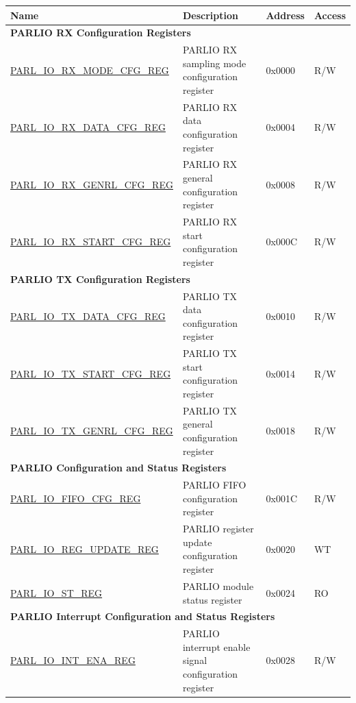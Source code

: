 \begin{longtable}{ | p{5cm} | p{7.8cm} | p{1.3cm} | p{1.6cm} | }
\hline\rowcolor{lightgray}
\textbf{Name} & \textbf{Description} &  \textbf{Address} & \textbf{Access} \\ \hline
\endhead
\multicolumn{4}{|l|}{\textbf{PARLIO RX Configuration Registers}} \\ \hline
\hyperref[regdesc:PARLIORXMODECFGREG]{PARL\_IO\_RX\_MODE\_CFG\_REG} & PARLIO RX sampling mode configuration register & 0x0000 & R/W \\ \hline
\hyperref[regdesc:PARLIORXDATACFGREG]{PARL\_IO\_RX\_DATA\_CFG\_REG} & PARLIO RX data configuration register & 0x0004 & R/W \\ \hline
\hyperref[regdesc:PARLIORXGENRLCFGREG]{PARL\_IO\_RX\_GENRL\_CFG\_REG} & PARLIO RX general configuration register & 0x0008 & R/W \\ \hline
\hyperref[regdesc:PARLIORXSTARTCFGREG]{PARL\_IO\_RX\_START\_CFG\_REG} & PARLIO RX start configuration register & 0x000C & R/W \\ \hline
\multicolumn{4}{|l|}{\textbf{PARLIO TX Configuration Registers}} \\ \hline
\hyperref[regdesc:PARLIOTXDATACFGREG]{PARL\_IO\_TX\_DATA\_CFG\_REG} & PARLIO TX data configuration register & 0x0010 & R/W \\ \hline
\hyperref[regdesc:PARLIOTXSTARTCFGREG]{PARL\_IO\_TX\_START\_CFG\_REG} & PARLIO TX start configuration register & 0x0014 & R/W \\ \hline
\hyperref[regdesc:PARLIOTXGENRLCFGREG]{PARL\_IO\_TX\_GENRL\_CFG\_REG} & PARLIO TX general configuration register & 0x0018 & R/W \\ \hline
\multicolumn{4}{|l|}{\textbf{PARLIO Configuration and Status Registers}} \\ \hline
\hyperref[regdesc:PARLIOFIFOCFGREG]{PARL\_IO\_FIFO\_CFG\_REG} & PARLIO FIFO configuration register & 0x001C & R/W \\ \hline
\hyperref[regdesc:PARLIOREGUPDATEREG]{PARL\_IO\_REG\_UPDATE\_REG} & PARLIO register update configuration register & 0x0020 & WT \\ \hline
\hyperref[regdesc:PARLIOSTREG]{PARL\_IO\_ST\_REG} & PARLIO module status register & 0x0024 & RO \\ \hline
\multicolumn{4}{|l|}{\textbf{PARLIO Interrupt Configuration and Status Registers}} \\ \hline
\hyperref[regdesc:PARLIOINTENAREG]{PARL\_IO\_INT\_ENA\_REG} & PARLIO interrupt enable signal configuration register & 0x0028 & R/W \\ \hline

\end{longtable}
